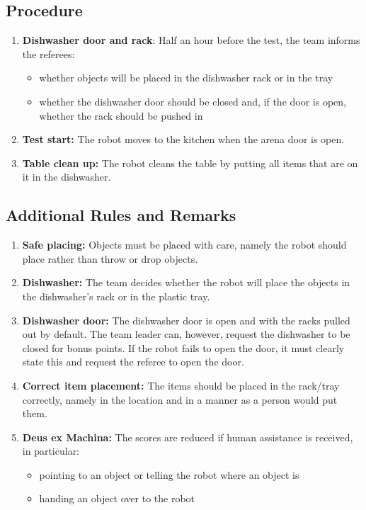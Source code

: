 \subsection*{Procedure}
\begin{enumerate}[nosep]
	\item \textbf{Dishwasher door and rack}: Half an hour before the test, the team informs the referees:
		\begin{itemize}
			\item whether objects will be placed in the dishwasher rack or in the tray
			\item whether the dishwasher door should be closed and, if the door is open, whether the rack should be pushed in
		\end{itemize}
	\item \textbf{Test start:} The robot moves to the kitchen when the arena door is open.
	\item \textbf{Table clean up:} The robot cleans the table by putting all items that are on it in the dishwasher.
\end{enumerate}


\subsection*{Additional Rules and Remarks}
\begin{enumerate}[nosep]
	\item \textbf{Safe placing:} Objects must be placed with care, namely the robot should place rather than throw or drop objects.
	\item \textbf{Dishwasher:} The team decides whether the robot will place the objects in the dishwasher's rack or in the plastic tray.
	\item \textbf{Dishwasher door:} The dishwasher door is open and with the racks pulled out by default.
	The team leader can, however, request the dishwasher to be closed for bonus points. If the robot fails to open the door, it must clearly state this and request the referee to open the door.
	\item \textbf{Correct item placement:} The items should be placed in the rack/tray correctly, namely in the location and in a manner as a person would put them.
	\item \textbf{Deus ex Machina:} The scores are reduced if human assistance is received, in particular:
	\begin{itemize}[nosep]
		\item pointing to an object or telling the robot where an object is
		\item handing an object over to the robot
	\end{itemize}
\end{enumerate}

